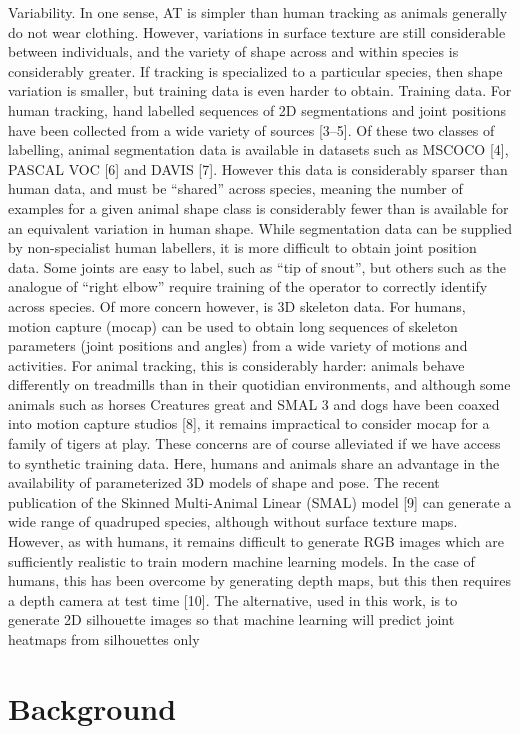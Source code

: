 Variability. In one sense, AT is simpler than human tracking as animals generally do not wear clothing. However, variations in surface texture are still
considerable between individuals, and the variety of shape across and within
species is considerably greater. If tracking is specialized to a particular species,
then shape variation is smaller, but training data is even harder to obtain.
Training data. For human tracking, hand labelled sequences of 2D segmentations and joint positions have been collected from a wide variety of sources [3–5].
Of these two classes of labelling, animal segmentation data is available in datasets
such as MSCOCO [4], PASCAL VOC [6] and DAVIS [7]. However this data is
considerably sparser than human data, and must be “shared” across species,
meaning the number of examples for a given animal shape class is considerably
fewer than is available for an equivalent variation in human shape. While segmentation data can be supplied by non-specialist human labellers, it is more
difficult to obtain joint position data. Some joints are easy to label, such as “tip
of snout”, but others such as the analogue of “right elbow” require training of
the operator to correctly identify across species.
Of more concern however, is 3D skeleton data. For humans, motion capture
(mocap) can be used to obtain long sequences of skeleton parameters (joint
positions and angles) from a wide variety of motions and activities. For animal
tracking, this is considerably harder: animals behave differently on treadmills
than in their quotidian environments, and although some animals such as horses
Creatures great and SMAL 3
and dogs have been coaxed into motion capture studios [8], it remains impractical
to consider mocap for a family of tigers at play.
These concerns are of course alleviated if we have access to synthetic training
data. Here, humans and animals share an advantage in the availability of parameterized 3D models of shape and pose. The recent publication of the Skinned
Multi-Animal Linear (SMAL) model [9] can generate a wide range of quadruped
species, although without surface texture maps. However, as with humans, it
remains difficult to generate RGB images which are sufficiently realistic to train
modern machine learning models. In the case of humans, this has been overcome
by generating depth maps, but this then requires a depth camera at test time [10].
The alternative, used in this work, is to generate 2D silhouette images so that
machine learning will predict joint heatmaps from silhouettes only

\section{Background} %

